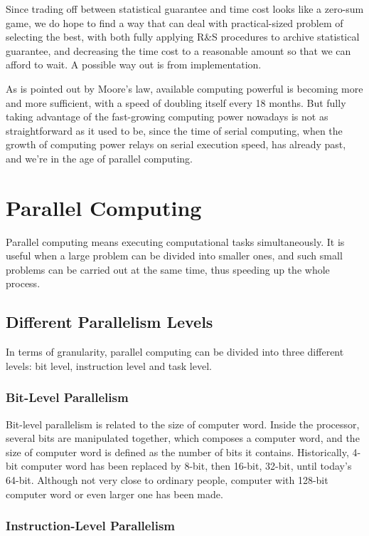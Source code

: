 \documentclass[12pt,a4]{report}
\begin{document}
Since trading off between statistical guarantee and time cost looks like a zero-sum game, we do hope to find a way that can deal with practical-sized problem of selecting the best, with both fully applying R\&S procedures to archive statistical guarantee, and decreasing the time cost to a reasonable amount so that we can afford to wait. A possible way out is from implementation.

As is pointed out by Moore's law, available computing powerful is becoming more and more sufficient, with a speed of doubling itself every 18 months. But fully taking advantage of the fast-growing computing power nowadays is not as straightforward as it used to be, since the time of serial computing, when the growth of computing power relays on serial execution speed, has already past, and we're in the age of parallel computing.

\chapter{Parallel Computing}

Parallel computing means executing computational tasks simultaneously. It is useful when a large problem can be divided into smaller ones, and such small problems can be carried out at the same time, thus speeding up the whole process.

\section{Different Parallelism Levels}

In terms of granularity, parallel computing can be divided into three different levels: bit level, instruction level and task level.

\subsection{Bit-Level Parallelism}

Bit-level parallelism is related to the size of computer word. Inside the processor, several bits are manipulated together, which composes a computer word, and the size of computer word is defined as the number of bits it contains. Historically, 4-bit computer word has been replaced by 8-bit, then 16-bit, 32-bit, until today's 64-bit. Although not very close to ordinary people, computer with 128-bit computer word or even larger one has been made.

\subsection{Instruction-Level Parallelism}
\end{document}
